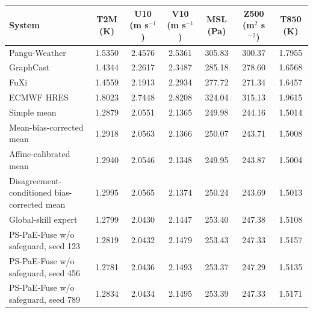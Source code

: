 \begin{tabular}{lcccccc}
\hline
System & T2M (K) & U10 (m s$^{-1}$) & V10 (m s$^{-1}$) & MSL (Pa) & Z500 (m$^2$ s$^{-2}$) & T850 (K) \\
\hline
Pangu-Weather & 1.5350 & 2.4576 & 2.5361 & 305.83 & 300.37 & 1.7955 \\
GraphCast & 1.4344 & 2.2617 & 2.3487 & 285.18 & 278.60 & 1.6568 \\
FuXi & 1.4559 & 2.1913 & 2.2934 & 277.72 & 271.34 & 1.6457 \\
ECMWF HRES & 1.8023 & 2.7448 & 2.8208 & 324.04 & 315.13 & 1.9615 \\
Simple mean & 1.2879 & 2.0551 & 2.1365 & 249.98 & 244.16 & 1.5014 \\
Mean-bias-corrected mean & 1.2918 & 2.0563 & 2.1366 & 250.07 & 243.71 & 1.5008 \\
Affine-calibrated mean & 1.2940 & 2.0546 & 2.1348 & 249.95 & 243.87 & 1.5004 \\
Disagreement-conditioned bias-corrected mean & 1.2995 & 2.0565 & 2.1374 & 250.24 & 243.69 & 1.5013 \\
Global-skill expert & 1.2799 & 2.0430 & 2.1447 & 253.40 & 247.38 & 1.5108 \\
PS-PaE-Fuse w/o safeguard, seed 123 & 1.2819 & 2.0432 & 2.1479 & 253.43 & 247.33 & 1.5157 \\
PS-PaE-Fuse w/o safeguard, seed 456 & 1.2781 & 2.0436 & 2.1493 & 253.37 & 247.29 & 1.5135 \\
PS-PaE-Fuse w/o safeguard, seed 789 & 1.2834 & 2.0434 & 2.1495 & 253.39 & 247.33 & 1.5171 \\
\hline
\end{tabular}
